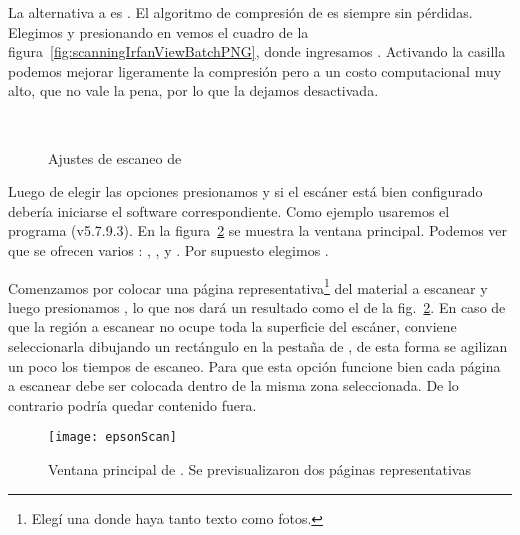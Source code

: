 \documentclass[%
	a5paper,
	10pt,
	twoside,
	openright,
	final,
]{memoir}
\begin{document}
{	La alternativa a \tiff es \png. El algoritmo de compresión de \png es siempre sin pérdidas. Elegimos  y presionando en   vemos el cuadro de la figura~\ref{fig:scanningIrfanViewBatchPNG}, donde ingresamos . Activando la casilla  podemos mejorar ligeramente la compresión pero a un costo computacional muy alto, que no vale la pena, por lo que la dejamos desactivada.

	\begin{figure}
		\centering
		\\
		\hfill
		\caption{Ajustes de escaneo de \irfanview\label{fig:scanningIrfanView}}
	\end{figure}

	Luego de elegir las opciones presionamos  y si el escáner está bien configurado debería iniciarse el software correspondiente. Como ejemplo usaremos el programa \epsonscan (v5.7.9.3). En la figura~\ref{fig:epsonScan} se muestra la ventana principal. Podemos ver que se ofrecen varios : , ,  y . Por supuesto elegimos .

	Comenzamos por colocar una página representativa\footnote{Elegí una donde haya tanto texto como fotos.} del material a escanear y luego presionamos , lo que nos dará un resultado como el de la fig.~\ref{fig:epsonScan}. En caso de que la región a escanear no ocupe toda la superficie del escáner, conviene seleccionarla dibujando un rectángulo en la pestaña de , de esta forma se agilizan un poco los tiempos de escaneo. \label{pag:scanningRegionSelection} Para que esta opción funcione bien cada página a escanear debe ser colocada dentro de la misma zona seleccionada. De lo contrario podría quedar contenido fuera.

	\begin{figure}
		\texttt{[image: epsonScan]}
		\caption[Ventana principal de \epsonscan]{Ventana principal de \epsonscan. Se previsualizaron dos páginas representativas\label{fig:epsonScan}}
	\end{figure}

}
\end{document}
